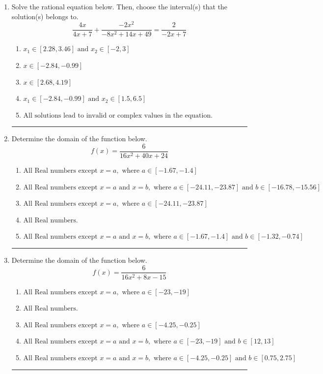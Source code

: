 \documentclass[14pt]{extbook}
\newcommand{\litem}[1]{\item#1\hspace*{-1cm}\rule{\textwidth}{0.4pt}}
\begin{document}
\begin{enumerate}
{\begin{enumerate}[label=\Alph*.]
\end{enumerate} }
\litem{
Solve the rational equation below. Then, choose the interval(s) that the solution(s) belongs to.\[ \frac{4x}{4x + 7} + \frac{-2x^{2}}{-8x^{2} +14 x + 49} = \frac{2}{-2x + 7} \]\begin{enumerate}[label=\Alph*.]
\item \( x_1 \in [2.28, 3.46] \text{ and } x_2 \in [-2,3] \)
\item \( x \in [-2.84,-0.99] \)
\item \( x \in [2.68,4.19] \)
\item \( x_1 \in [-2.84, -0.99] \text{ and } x_2 \in [1.5,6.5] \)
\item \( \text{All solutions lead to invalid or complex values in the equation.} \)

\end{enumerate} }
\litem{
Determine the domain of the function below.\[ f(x) = \frac{6}{16x^{2} +40 x + 24} \]\begin{enumerate}[label=\Alph*.]
\item \( \text{All Real numbers except } x = a, \text{ where } a \in [-1.67, -1.4] \)
\item \( \text{All Real numbers except } x = a \text{ and } x = b, \text{ where } a \in [-24.11, -23.87] \text{ and } b \in [-16.78, -15.56] \)
\item \( \text{All Real numbers except } x = a, \text{ where } a \in [-24.11, -23.87] \)
\item \( \text{All Real numbers.} \)
\item \( \text{All Real numbers except } x = a \text{ and } x = b, \text{ where } a \in [-1.67, -1.4] \text{ and } b \in [-1.32, -0.74] \)

\end{enumerate} }
\litem{
Determine the domain of the function below.\[ f(x) = \frac{6}{16x^{2} +8 x -15} \]\begin{enumerate}[label=\Alph*.]
\item \( \text{All Real numbers except } x = a, \text{ where } a \in [-23, -19] \)
\item \( \text{All Real numbers.} \)
\item \( \text{All Real numbers except } x = a, \text{ where } a \in [-4.25, -0.25] \)
\item \( \text{All Real numbers except } x = a \text{ and } x = b, \text{ where } a \in [-23, -19] \text{ and } b \in [12, 13] \)
\item \( \text{All Real numbers except } x = a \text{ and } x = b, \text{ where } a \in [-4.25, -0.25] \text{ and } b \in [0.75, 2.75] \)


\end{enumerate}}
\end{enumerate}
\end{document}
